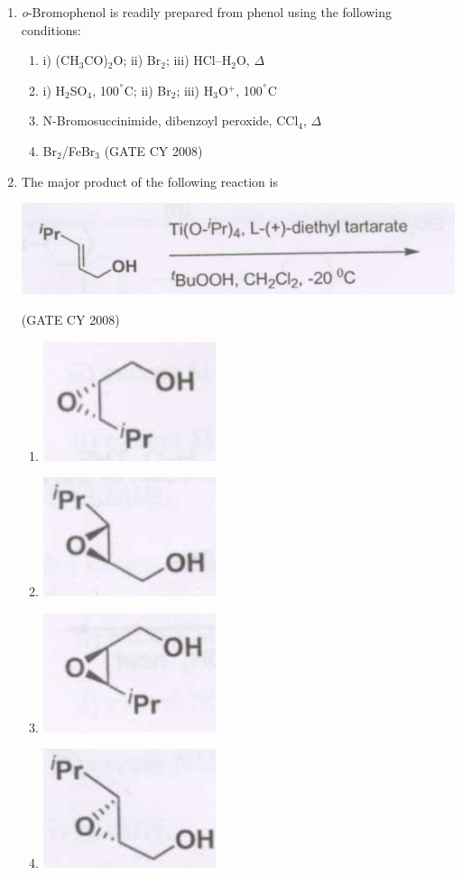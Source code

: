 \documentclass[12pt]{article}
\begin{document}
\begin{enumerate}
\item \textit{o}-Bromophenol is readily prepared from phenol using the following conditions:
\begin{enumerate}
\item i) (CH$_3$CO)$_2$O;  ii) Br$_2$;  iii) HCl–H$_2$O, $\Delta$
\item i) H$_2$SO$_4$, 100$^\degree$C;  ii) Br$_2$;  iii) H$_3$O$^+$, 100$^\degree$C
\item N-Bromosuccinimide, dibenzoyl peroxide, CCl$_4$, $\Delta$
\item Br$_2$/FeBr$_3$    \hfill{(GATE CY 2008)}
\end{enumerate}


\item The major product of the following reaction is

\begin{center}
\includegraphics[width=0.6\columnwidth]{figs/q42.png}
\end{center}    \hfill{(GATE CY 2008)}
\begin{enumerate}
    \item \includegraphics[width=0.2\columnwidth]{figs/q42 a.png} 
    \item \includegraphics[width=0.2\columnwidth]{figs/q42 b.png} 
    \item \includegraphics[width=0.2\columnwidth]{figs/q42 c.png} 
    \item \includegraphics[width=0.2\columnwidth]{figs/q42 d.png} 
\end{enumerate}


\end{enumerate}
\end{document}
